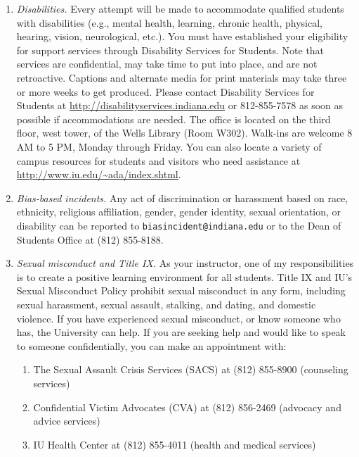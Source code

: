 \documentclass[11pt,article,oneside]{memoir} %
\begin{document}
\begin{enumerate}

\item \emph{Disabilities.} Every attempt will be made to accommodate qualified students with disabilities (e.g., mental health, learning, chronic health, physical, hearing, vision, neurological, etc.). 
You must have established your eligibility for support services through Disability Services for Students. 
Note that services are confidential, may take time to put into place, and are not retroactive.  
Captions and alternate media for print materials may take three or more weeks to get produced. 
Please contact Disability Services for Students at \url{http://disabilityservices.indiana.edu} or 812-855-7578 as soon as possible if accommodations are needed. 
The office is located on the third floor, west tower, of the Wells Library (Room W302). 
Walk-ins are welcome 8 AM to 5 PM, Monday through Friday. 
You can also locate a variety of campus resources for students and visitors who need assistance at \url{http://www.iu.edu/~ada/index.shtml}.

\item \emph{Bias-based incidents.} Any act of discrimination or harassment based on 
race, ethnicity, religious affiliation, gender, gender identity, sexual orientation, or
disability can be reported to \texttt{biasincident@indiana.edu} or to the Dean of Students Office at (812) 855-8188. 

\item \emph{Sexual misconduct and Title IX.} As your instructor, one of my
responsibilities is to create a positive learning environment for all students.
Title IX and IU's Sexual Misconduct Policy prohibit sexual misconduct in any
form, including sexual harassment, sexual assault, stalking, and dating, and
domestic violence.  If you have experienced sexual misconduct, or know someone
who has, the University can help. If you are seeking help and would like to
speak to someone confidentially, you can make an appointment with:

\begin{enumerate}

\item The Sexual Assault Crisis Services (SACS) at (812) 855-8900 (counseling services)
\item Confidential Victim Advocates (CVA) at (812) 856-2469 (advocacy and advice services)
\item IU Health Center at (812) 855-4011 (health and medical services)


\end{enumerate}
\end{enumerate}
\end{document}
